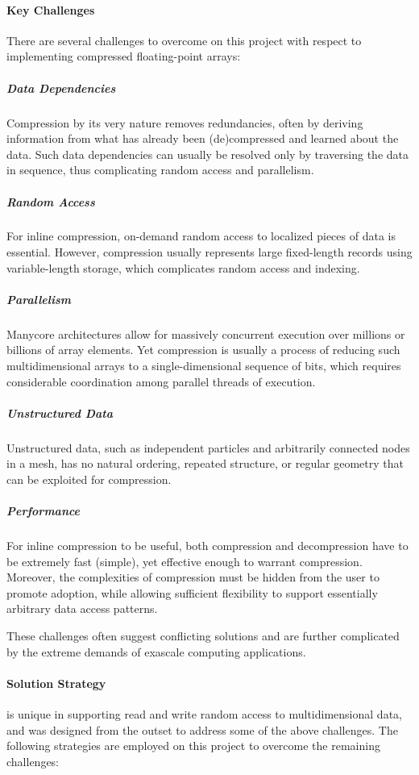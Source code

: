 \paragraph{Key Challenges}

There are several challenges to overcome on this project with respect
to implementing compressed floating-point arrays:
%
\subparagraph{Data Dependencies}  Compression by its very nature removes
redundancies, often by deriving information from what has already been
(de)compressed and learned about the data.  Such data dependencies can
usually be resolved only by traversing the data in sequence, thus
complicating random access and parallelism.

\subparagraph{Random Access}  For inline compression, on-demand random
access to localized pieces of data is essential.  However, compression
usually represents large fixed-length records using variable-length
storage, which complicates random access and indexing.

\subparagraph{Parallelism}  Manycore architectures allow for massively
concurrent execution over millions or billions of array elements.
Yet compression is usually a process of reducing such multidimensional
arrays to a single-dimensional sequence of bits, which requires considerable coordination among parallel
threads of execution.

\subparagraph{Unstructured Data}  Unstructured data, such as independent
particles and arbitrarily connected nodes in a mesh, has no natural
ordering, repeated structure, or regular geometry that can be exploited
for compression.

\subparagraph{Performance}  For inline compression to be useful, both
compression and decompression have to be extremely fast (simple), yet
effective enough to warrant compression.  Moreover, the complexities of
compression must be hidden from the user to promote adoption, while allowing
sufficient flexibility to support essentially arbitrary data access patterns.

%
These challenges often suggest conflicting solutions and are further
complicated by the extreme demands of exascale computing applications.

\paragraph{Solution Strategy}

{\zfp} is unique in supporting read and write random access to
multidimensional data, and was designed from the outset to address
some of the above challenges.  The following strategies are employed on
this project to overcome the remaining challenges:
%

